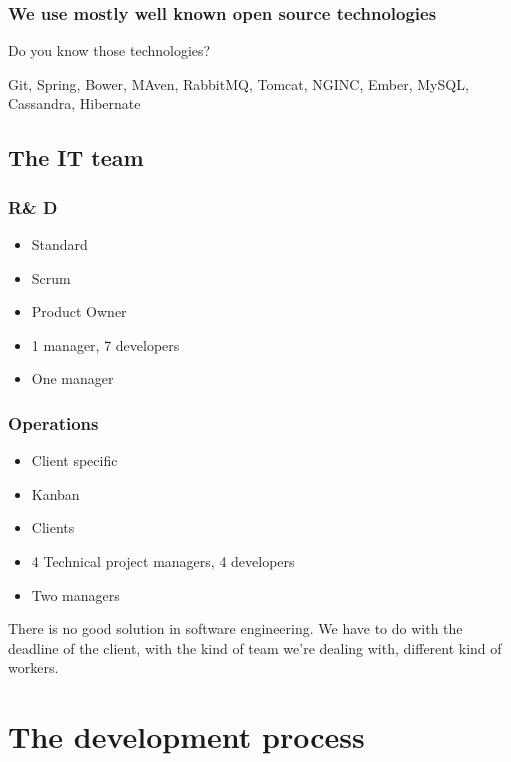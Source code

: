 \documentclass[a4paper, 11pt]{article}
\begin{document}
    \subsubsection{We use mostly well known open source technologies}

    Do you know those technologies?

    Git, Spring, Bower, MAven, RabbitMQ, Tomcat, NGINC, Ember, MySQL, Cassandra, Hibernate

    \subsection{The IT team}

    \subsubsection{R\& D}

    \begin{itemize}
        \item Standard
        \item Scrum
        \item Product Owner
        \item 1 manager, 7 developers
        \item One manager
    \end{itemize}

    \subsubsection{Operations}

    \begin{itemize}
        \item Client specific
        \item Kanban
        \item Clients
        \item 4 Technical project managers, 4 developers
        \item Two managers
    \end{itemize}

    There is no good solution in software engineering. We have to do with the
    deadline of the client, with the kind of team we're dealing with, different
    kind of workers.

    \section{The development process}
\end{document}

